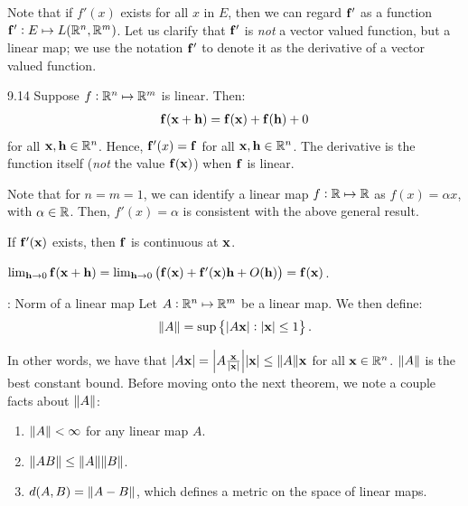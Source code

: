 \noindent Note that if $f'(x)$ exists for all $x$ in $E$, then we can regard $\mathbf{f}'$ as a function $\mathbf{f}': E \mapsto L(\mathbb{R}^n, \mathbb{R}^m)$. Let us clarify that $\mathbf{f}'$ is \emph{not} a vector valued function, but a linear map; we use the notation $\mathbf{f}'$ to denote it as the derivative of a vector valued function.

\setcounter{rudin}{13}
\begin{example}{}{9.14}
    Suppose $f: \mathbb{R}^n \mapsto \mathbb{R}^m$ is linear. Then:
    \begin{align*}
        \mathbf{f}(\mathbf{x} + \mathbf{h}) = \mathbf{f}(\mathbf{x}) + \mathbf{f}(\mathbf{h}) + 0
    \end{align*}
    for all $\mathbf{x}, \mathbf{h} \in \mathbb{R}^n$. Hence, $\mathbf{f}'(x) = \mathbf{f}$ for all $\mathbf{x}, \mathbf{h} \in \mathbb{R}^n$. The derivative is the function itself (\emph{not} the value $\mathbf{f}(\mathbf{x})$) when $\mathbf{f}$ is linear.

    Note that for $n = m = 1$, we can identify a linear map $f: \mathbb{R} \mapsto \mathbb{R}$ as $f(x) = \alpha x$, with $\alpha \in \mathbb{R}$. Then, $f'(x) = \alpha$ is consistent with the above general result.
\end{example}
\begin{ntheorem}{}{}
    If $\mathbf{f}'(\mathbf{x})$ exists, then $\mathbf{f}$ is continuous at $\mathbf{x}$.
\end{ntheorem}
\begin{nproof}
    $\lim_{\mathbf{h} \rightarrow 0}\mathbf{f}(\mathbf{x} + \mathbf{h}) = \lim_{\mathbf{h} \rightarrow 0}\left(\mathbf{f}(\mathbf{x}) + \mathbf{f}'(\mathbf{x})\mathbf{h} + O(\mathbf{h})\right) = \mathbf{f}(\mathbf{x})$.
\end{nproof}

\begin{ndef}{: Norm of a linear map}{}
    Let $A: \mathbb{R}^n \mapsto \mathbb{R}^m$ be a linear map. We then define:
    \begin{align*}
        \norm{A} = \sup\set{\abs{A\ensuremath{\mathbf{x}}}: \abs{\ensuremath{\mathbf{x}}} \leq 1}.
    \end{align*}
\end{ndef}
\noindent In other words, we have that $\abs{A\mathbf{x}} = \abs{A\frac{\mathbf{x}}{\abs{\mathbf{x}}}}\abs{\mathbf{x}} \leq \norm{A}\mathbf{x}$ for all $\mathbf{x} \in \mathbb{R}^n$. $\norm{A}$ is the best constant bound. Before moving onto the next theorem, we note a couple facts about $\norm{A}$:
\begin{enumerate}
    \item $\norm{A} < \infty$ for any linear map $A$.
    \item $\norm{AB} \leq \norm{A}\norm{B}$.
    \item $d(A, B) = \norm{A - B}$, which defines a metric on the space of linear maps.
\end{enumerate}

